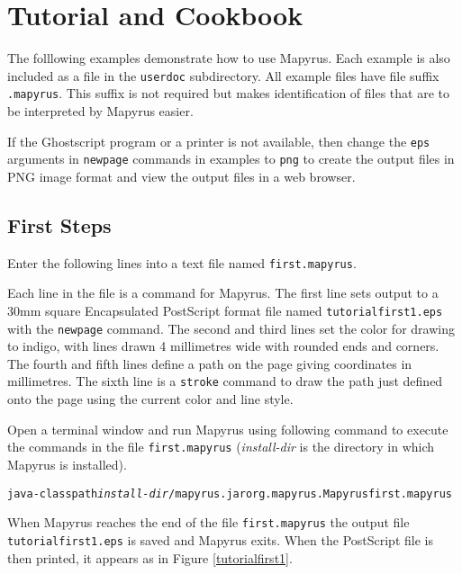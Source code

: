 
\section{Tutorial and Cookbook}

The folllowing examples demonstrate how to use Mapyrus.  Each example is also
included as a file in the \texttt{userdoc} subdirectory.  All example files
have file suffix \texttt{.mapyrus}.  This suffix is not required but makes
identification of files that are to be interpreted by Mapyrus easier.

If the Ghostscript program or a printer is not available, then change the
\texttt{eps} arguments in \texttt{newpage} commands in examples to \texttt{png}
to create the output files in PNG image format and view the output files in a
web browser.

\subsection{First Steps}

Enter the following lines into a text file named \texttt{first.mapyrus}.



Each line in the file is a command for Mapyrus.  The first line sets output to
a 30mm square Encapsulated PostScript format file named
\texttt{tutorialfirst1.eps} with the \texttt{newpage} command.  The second and
third lines set the color for drawing to indigo, with lines drawn 4 millimetres
wide with rounded ends and corners.  The fourth and fifth lines define a path
on the page giving coordinates in millimetres.  The sixth line is a
\texttt{stroke} command to draw the path just defined onto the page using the
current color and line style.

Open a terminal window and run Mapyrus using following command to execute the
commands in the file \texttt{first.mapyrus}
(\textit{install-dir} is the directory
in which Mapyrus is installed).

\begin{alltt}
java -classpath \textit{install-dir}/mapyrus.jar org.mapyrus.Mapyrus first.mapyrus
\end{alltt}

When Mapyrus reaches the end of the file \texttt{first.mapyrus}
the output file \texttt{tutorialfirst1.eps} is saved and Mapyrus exits.
When the PostScript file is then printed, it appears as in
Figure \ref{tutorialfirst1}.

